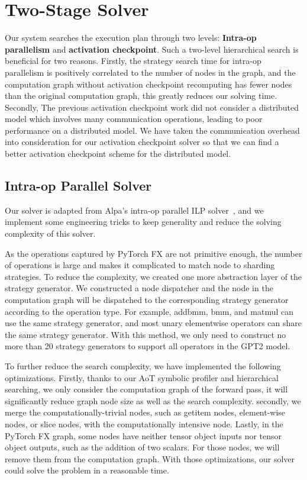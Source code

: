 \section{Two-Stage Solver}

Our system searches the execution plan through two levels: \textbf{Intra-op parallelism} and \textbf{activation checkpoint}. Such a two-level hierarchical search is beneficial for two reasons. 
Firstly, the strategy search time for intra-op parallelism is positively correlated to the number of nodes in the graph, and the computation graph without activation checkpoint recomputing has fewer nodes than the original computation graph, this greatly reduces our solving time.
Secondly, The previous activation checkpoint work did not consider a distributed model which involves many communication operations, leading to poor performance on a distributed model. 
We have taken the communication overhead into consideration for our activation checkpoint solver so that we can find a better activation checkpoint scheme for the distributed model.

\subsection{Intra-op Parallel Solver}

Our solver is adapted from Alpa's intra-op parallel ILP solver~\cite{zheng2022alpa}, and we implement some engineering tricks to keep generality and reduce the solving complexity of this solver.

As the operations captured by PyTorch FX are not primitive enough, the number of operations is large and makes it complicated to match node to sharding strategies. To reduce the complexity, we created one more abstraction layer of the strategy generator. We constructed a node dispatcher and the node in the computation graph will be dispatched to the corresponding strategy generator according to the operation type. For example, addbmm, bmm, and matmul can use the same strategy generator, and most unary elementwise operators can share the same strategy generator. With this method, we only need to construct no more than 20 strategy generators to support all operators in the GPT2 model.

To further reduce the search complexity, we have implemented the following optimizations. Firstly, thanks to our AoT symbolic profiler and hierarchical searching, we only consider the computation graph of the forward pass, it will significantly reduce graph node size as well as the search complexity. secondly, we merge the computationally-trivial nodes, such as getitem nodes, element-wise nodes, or slice nodes, with the computationally intensive node. Lastly, in the PyTorch FX graph, some nodes have neither tensor object inputs nor tensor object outputs, such as the addition of two scalars. For those nodes, we will remove them from the computation graph. With those optimizations, our solver could solve the problem in a reasonable time. 

